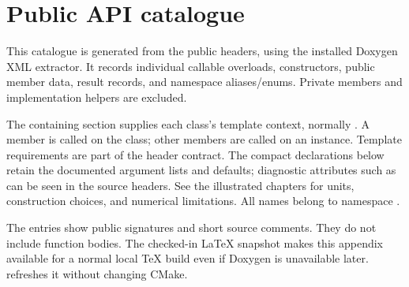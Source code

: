 \chapter{Public API catalogue}\label{chap:reference}
This catalogue is generated from the public headers, using the installed
Doxygen XML extractor. It records individual callable overloads, constructors,
public member data, result records, and namespace aliases/enums. Private
members and  implementation helpers are excluded.

The containing section supplies each class's template context, normally
. A  member is called on the class; other members are
called on an instance. Template requirements are part of the header contract.
The compact declarations below retain the documented argument lists and
defaults; diagnostic attributes such as \api{[[nodiscard]]} can be seen in the
source headers. See the illustrated chapters for units, construction choices,
and numerical limitations. All names belong to namespace .

\begin{manualnote}
The entries show public signatures and short source comments. They do not
include function bodies. The checked-in LaTeX snapshot makes this appendix
available for a normal local TeX build even if Doxygen is unavailable later.
 refreshes it without changing CMake.
\end{manualnote}

